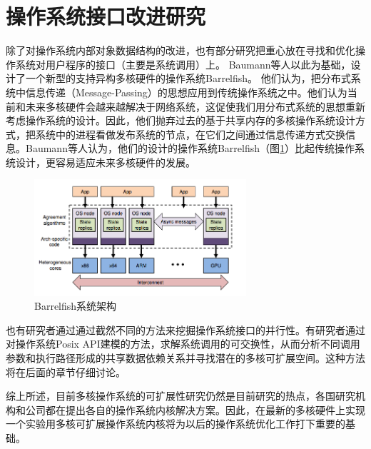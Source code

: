 \section{操作系统接口改进研究}
除了对操作系统内部对象数据结构的改进，也有部分研究把重心放在寻找和优化操作系统对用户程序的接口（主要是系统调用）上。
Baumann等人以此为基础，设计了一个新型的支持异构多核硬件的操作系统Barrelfish\cite{Baumann:2009:MNO:1629575.1629579}。
他们认为，把分布式系统中信息传递（Message-Passing）的思想应用到传统操作系统之中。他们认为当前和未来多核硬件会越来越解决于网络系统，这促使我们用分布式系统的思想重新考虑操作系统的设计。因此，他们抛弃过去的基于共享内存的多核操作系统设计方式，把系统中的进程看做发布系统的节点，在它们之间通过信息传递方式交换信息。Baumann等人认为，他们的设计的操作系统Barrelfish（图\ref{fig:barrelfish}）比起传统操作系统设计，更容易适应未来多核硬件的发展。

\begin{figure}[ht]
\begin{center}
\includegraphics[width=0.7\textwidth]{figures/barrelfish.png}
\end{center}
\caption{Barrelfish系统架构\cite{Baumann:2009:MNO:1629575.1629579}}
\label{fig:barrelfish}
\end{figure}

也有研究者通过通过截然不同的方法来挖掘操作系统接口的并行性。有研究者\cite{commuter:2013}通过对操作系统Posix API建模的方法，求解系统调用的可交换性，从而分析不同调用参数和执行路径形成的共享数据依赖关系并寻找潜在的多核可扩展空间。这种方法将在后面的章节仔细讨论。

综上所述，目前多核操作系统的可扩展性研究仍然是目前研究的热点，各国研究机构和公司都在提出各自的操作系统内核解决方案。因此，在最新的多核硬件上实现一个实验用多核可扩展操作系统内核将为以后的操作系统优化工作打下重要的基础。


